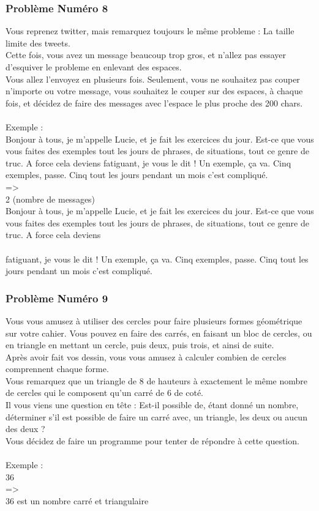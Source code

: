 \documentclass[12pt]{article}
\begin{document}
\subsubsection{Problème Numéro 8}

Vous reprenez twitter, mais remarquez toujours le même probleme : La taille limite des tweets.\\
Cette fois, vous avez un message beaucoup trop gros, et n'allez pas essayer d'esquiver le probleme en enlevant des espaces.\\
Vous allez l'envoyez en plusieurs fois. Seulement, vous ne souhaitez pas couper n'importe ou votre message, vous souhaitez le couper sur des espaces, à chaque fois, et décidez de faire des messages avec l'espace le plus proche des 200 chars.
\\\\
Exemple :\\
Bonjour à tous, je m'appelle Lucie, et je fait les exercices du jour. Est-ce que vous vous faites des exemples tout les jours de phrases, de situations, tout ce genre de truc. A force cela deviens fatiguant, je vous le dit ! Un exemple, ça va. Cinq exemples, passe. Cinq tout les jours pendant un mois c'est compliqué.\\
=\textgreater\\
2 (nombre de messages)\\
Bonjour à tous, je m'appelle Lucie, et je fait les exercices du jour. Est-ce que vous vous faites des exemples tout les jours de phrases, de situations, tout ce genre de truc. A force cela deviens
\\\\
fatiguant, je vous le dit ! Un exemple, ça va. Cinq exemples, passe. Cinq tout les jours pendant un mois c'est compliqué.

\subsubsection{Problème Numéro 9}

Vous vous amusez à utiliser des cercles pour faire plusieurs formes géométrique sur votre cahier. Vous pouvez en faire des carrés, en faisant un bloc de cercles, ou en triangle en mettant un cercle, puis deux, puis trois, et ainsi de suite.\\
Après avoir fait vos dessin, vous vous amusez à calculer combien de cercles comprennent chaque forme.\\
Vous remarquez que un triangle de 8 de hauteurs à exactement le même nombre de cercles qui le composent qu'un carré de 6 de coté.\\
Il vous viens une question en tête : Est-il possible de, étant donné un nombre, déterminer s'il est possible de faire un carré avec, un triangle, les deux ou aucun des deux ?\\
Vous décidez de faire un programme pour tenter de répondre à cette question.
\\\\
Exemple :\\
36\\
=\textgreater\\
36 est un nombre carré et triangulaire
\end{document}
